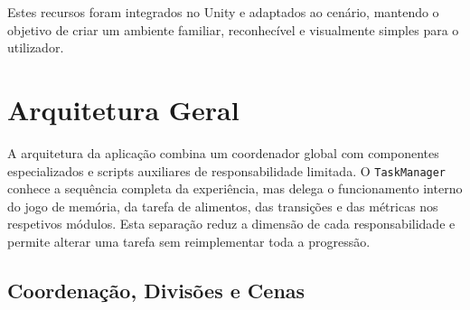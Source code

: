 \documentclass[12pt,a4paper,oneside]{report}
\begin{document}
Estes recursos foram integrados no Unity e adaptados ao cenário, mantendo o objetivo de criar um ambiente familiar, reconhecível e visualmente simples para o utilizador.

\section{Arquitetura Geral}

A arquitetura da aplicação combina um coordenador global com componentes especializados e scripts auxiliares de responsabilidade limitada. O \texttt{TaskManager} conhece a sequência completa da experiência, mas delega o funcionamento interno do jogo de memória, da tarefa de alimentos, das transições e das métricas nos respetivos módulos. Esta separação reduz a dimensão de cada responsabilidade e permite alterar uma tarefa sem reimplementar toda a progressão.

\subsection{Coordenação, Divisões e Cenas}
\end{document}
